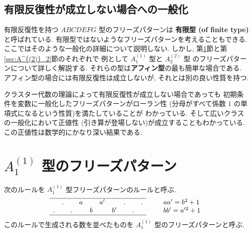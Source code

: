 \documentclass[12pt,twoside,dvipdfm]{jarticle}
\theoremstyle{definition} %
\theoremstyle{definition} %
\theoremstyle{definition} %
\numberwithin{theorem}{section}
\numberwithin{equation}{section}
\numberwithin{figure}{section}
\numberwithin{table}{section}
\newcommand\secref[1]{第\ref{#1}節}
\begin{document}
\subsection{有限反復性が成立しない場合への一般化}

有限反復性を持つ $ABCDEFG$ 型のフリーズパターンは
{\bf 有限型 (of finite type)}と呼ばれている.
有限型ではないようなフリーズパターンを考えることもできる.
ここではそのような一般化の詳細について説明しない.
しかし, \secref{sec:A^{(1)}_1}と\secref{sec:A^{(2)}_2}のそれぞれで
例として $A^{(1)}_1$ 型と $A^{(2)}_2$ 型
のフリーズパターンについて詳しく解説する. 
それらの型は{\bf アフィン型}の最も簡単な場合である.
アフィン型の場合には有限反復性は成立しないが,
それとは別の良い性質を持つ.

クラスター代数の理論によって有限反復性が成立しない場合であっても
初期条件を変数に一般化したフリーズパターンがローラン性
(分母がすべて係数 $1$ の単項式になるという性質)を満たしていることが
わかっている.  そして広いクラスの一般化において正値性
(引き算が登場しない)が成立することもわかっている.
この正値性は数学的にかなり深い結果である.


\section{$A^{(1)}_1$ 型のフリーズパターン}
\label{sec:A^{(1)}_1}

次のルールを $A^{(1)}_1$ 型フリーズパターンのルールと呼ぶ.
\begin{equation*}
\begin{array}{cccccccccc} \hline
   & . &   & a &   & a'&   & . &   & . \\
 . &   & . &   & b &   & b'&   & . &   \\ \hline
\end{array}
\qquad
\begin{array}{l}
aa' = b^2  +1 \\
bb' = a'^2 +1 \\
\end{array}
\end{equation*}
このルールで生成される数を並べたものを $A^{(1)}_1$ 型のフリーズパターンと呼ぶ.
\end{document}
